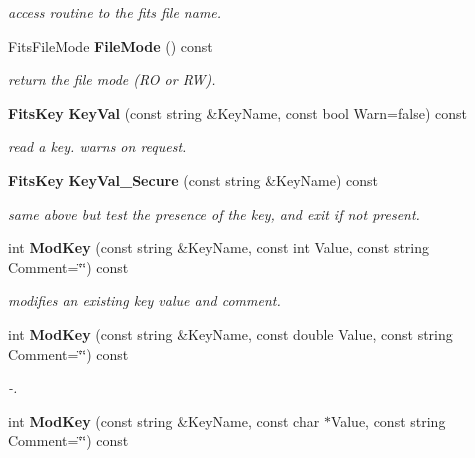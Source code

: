 \begin{CompactItemize}
\begin{CompactList}\small\item\em access routine to the fits file name.\item\end{CompactList}\item 
{}
Fits\-File\-Mode {\bf File\-Mode} () const\label{class_fitsheader_a6}

\begin{CompactList}\small\item\em return the file mode (RO or RW).\item\end{CompactList}\item 
{\bf Fits\-Key} {\bf Key\-Val} (const string \&Key\-Name, const bool Warn=false) const
\begin{CompactList}\small\item\em read a key. warns on request.\item\end{CompactList}\item 
{}
{\bf Fits\-Key} {\bf Key\-Val\_\-Secure} (const string \&Key\-Name) const\label{class_fitsheader_a8}

\begin{CompactList}\small\item\em same above but test the presence of the key, and exit if not present.\item\end{CompactList}\item 
int {\bf Mod\-Key} (const string \&Key\-Name, const int Value, const string Comment=\char`\"{}\char`\"{}) const
\begin{CompactList}\small\item\em modifies an existing key value and comment.\item\end{CompactList}\item 
{}
int {\bf Mod\-Key} (const string \&Key\-Name, const double Value, const string Comment=\char`\"{}\char`\"{}) const\label{class_fitsheader_a10}

\begin{CompactList}\small\item\em -.\item\end{CompactList}\item 
{}
int {\bf Mod\-Key} (const string \&Key\-Name, const char $\ast$Value, const string Comment=\char`\"{}\char`\"{}) const\label{class_fitsheader_a11}


\end{CompactItemize}

